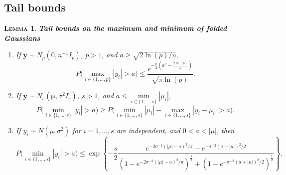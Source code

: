 \documentclass[bj,authoryear]{imsart}
\theoremstyle{plain}
\newtheorem{lem}[thm]{\textsc{Lemma}}
\newcommand{\bs}{\boldsymbol}
\begin{document}
\subsection{Tail bounds}

\begin{lem}\label{lemma:3tailbounds}\textbf{Tail bounds on the maximum and minimum of folded Gaussians} 
\begin{enumerate}[label=(\roman*)]
        \item If $\bs y\sim N_p(0,n^{-1}I_p)$, $p>1$, and $a \geq \sqrt{2\ln(p)/n}$, $$P\Big(\underset{i\in\{1,\ldots,p\}}{\max}|y_i|> a \Big) \leq \frac{e^{-\frac{n}{2}\left(a^2-\frac{2\ln (p)}{n}\right)}}{\sqrt{\pi\ln (p)}}.$$
    \item If $\bs y\sim N_s\left(\bs\mu,\sigma^2I_s\right)$, $s>1$, and $a \leq \underset{i\in\{1,\ldots,s\}}{\min}|\mu_i|$,
        $$P\Big(\underset{i\in\{1,\ldots,s\}}{\min}|y_i| > a\Big) \geq P\Big(\underset{i\in\{1,\ldots,s\}}{\min}|\mu_i|-\underset{i\in\{1,\ldots,s\}}{\max}|y_i-\mu_i| > a \Big).$$
    \item If $y_i\sim N\left(\mu,\sigma^2\right)$ for $i=1,\ldots,s$ are independent, and $0<a<|\mu|$, then
        $$P\Big(\underset{i\in\{1,\ldots,s\}}{\min}|y_i| > a \Big) \leq \exp\left\{-\frac{s}{2}\frac{e^{-2\sigma^{-2}(|\mu|-a)^2/\pi}-e^{-\sigma^{-2}(a+|\mu|)^2/2}}{\left(1-e^{-2\sigma^{-2}(|\mu|-a)^2/\pi}\right)^{\frac{1}{2}}+\left(1-e^{-\sigma^{-2}(a+|\mu|)^2/2}\right)^{\frac{1}{2}}}\right\}.$$
\end{enumerate}
\end{lem}
\end{document}
